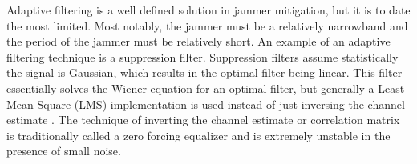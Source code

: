\begin{table}[!ht]\label{antitable}
\centering
\caption{Comparision of Anti-Jamming Techniques}

\end{table}

Adaptive filtering is a well defined solution in jammer mitigation, but it is to date the most limited.  Most notably, the jammer must be a relatively narrowband and the period of the jammer must be relatively short.  An example of an adaptive filtering technique is a suppression filter.  Suppression filters assume statistically the signal is Gaussian, which results in the optimal filter being linear.  This filter essentially solves the Wiener equation for an optimal filter, but generally a Least Mean Square (LMS) implementation is used instead of just inversing the channel estimate \cite{11}. The technique of inverting the channel estimate or correlation matrix is traditionally called a zero forcing equalizer and is extremely unstable in the presence of small noise.\\

